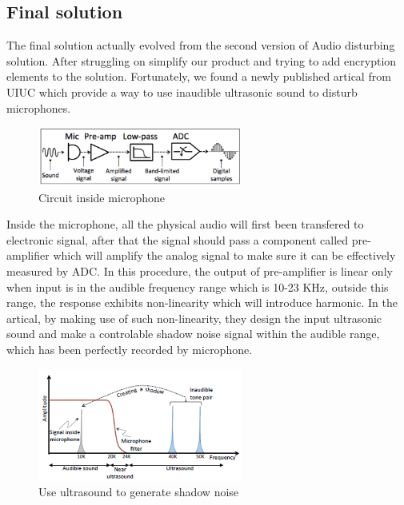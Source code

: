 \documentclass[12pt,twoside]{article}
\begin{document}
\subsection{Final solution}
The final solution actually evolved from the second version of Audio disturbing solution. After struggling on simplify our product and trying to add encryption 
elements to the solution. Fortunately, we found a newly published artical from UIUC \cite{RoyNirupam2017BMMH} which provide a way to use inaudible ultrasonic sound
to disturb microphones.\\

\begin{figure}[!htb]
\centering
\includegraphics[width=0.6\textwidth]{mic_circuit.png}
\caption{Circuit inside microphone}
\label{fig:Circuit inside microphone}
\end{figure}
Inside the microphone, all the physical audio will first been transfered to electronic signal, after that the signal should pass a component called pre-amplifier 
which will amplify the analog signal to make sure it can be effectively measured by ADC. In this procedure, the output of pre-amplifier is linear only when input 
is in the audible frequency range which is 10-23 KHz, outside this range, the response exhibits non-linearity which will introduce harmonic. In the artical, 
by making use of such non-linearity, they design the input ultrasonic sound and make a controlable shadow noise signal within the audible range, which has been
perfectly recorded by microphone.

\begin{figure}[!htb]
\centering
\includegraphics[width=0.6\textwidth]{shadow.png}
\caption{Use ultrasound to generate shadow noise}
\label{fig:Use ultrasound to generate shadow noise}
\end{figure}
\end{document}
